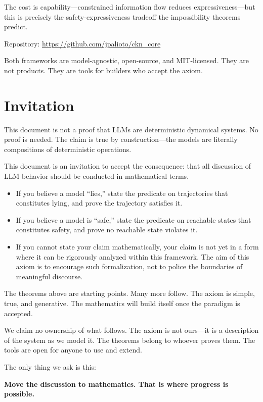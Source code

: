 \documentclass[11pt,a4paper]{article}
\begin{document}
The cost is capability---constrained information flow reduces expressiveness---but this is precisely the safety-expressiveness tradeoff the impossibility theorems predict.

Repository: \url{https://github.com/jpalioto/ckn_core}

Both frameworks are model-agnostic, open-source, and MIT-licensed. They are not products. They are tools for builders who accept the axiom.

\section{Invitation}

This document is not a proof that LLMs are deterministic dynamical systems. No proof is needed. The claim is true by construction---the models are literally compositions of deterministic operations.

This document is an invitation to accept the consequence: that all discussion of LLM behavior should be conducted in mathematical terms.

\begin{itemize}
    \item If you believe a model ``lies,'' state the predicate on trajectories that constitutes lying, and prove the trajectory satisfies it.
    \item If you believe a model is ``safe,'' state the predicate on reachable states that constitutes safety, and prove no reachable state violates it.
    \item If you cannot state your claim mathematically, your claim is not yet in a form where it can be rigorously analyzed within this framework. The aim of this axiom is to encourage such formalization, not to police the boundaries of meaningful discourse.
\end{itemize}

The theorems above are starting points. Many more follow. The axiom is simple, true, and generative. The mathematics will build itself once the paradigm is accepted.

We claim no ownership of what follows. The axiom is not ours---it is a description of the system as we model it. The theorems belong to whoever proves them. The tools are open for anyone to use and extend.

The only thing we ask is this:

\textbf{Move the discussion to mathematics. That is where progress is possible.}
\end{document}
